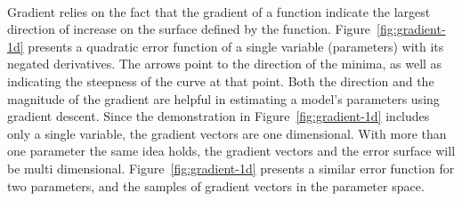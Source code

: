 \begin{marginfigure}
  \centering
      \\[2mm]
  \caption{\label{fig:gradient-1d}%
    A quadratic error curve in 3D (top),
    and the gradients at each point (bottom)
  }
\end{marginfigure}
Gradient relies on the fact that the gradient of a function
indicate the largest direction of increase
on the surface defined by the function.
Figure~\ref{fig:gradient-1d} presents a quadratic error function
of a single variable (parameters) with its negated derivatives.
The arrows point to the direction of the minima,
as well as indicating the steepness of the curve at that point.
Both the direction and the magnitude of the gradient
are helpful in estimating a model's parameters using gradient descent.
Since the demonstration in Figure~\ref{fig:gradient-1d} includes
only a single variable, the gradient vectors are one dimensional.
With more than one parameter the same idea holds,
the gradient vectors and the error surface will be multi dimensional.
Figure~\ref{fig:gradient-1d} presents a similar error function
for two parameters, and the samples of gradient vectors
in the parameter space.

